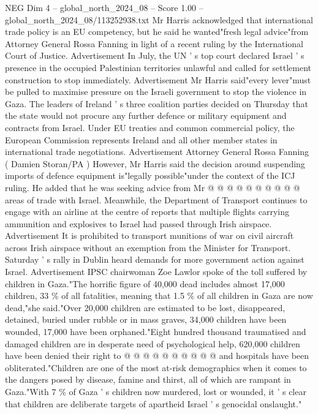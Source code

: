 \begin{textsample}{NEG Dim 4 – global\_north\_2024\_08 – Score 1.00 – global\_north\_2024\_08/113252938.txt}  \label{ex:f4_neg_296}
Mr Harris acknowledged that international trade policy is an EU competency, but he said he wanted"fresh legal advice"from Attorney General Rossa Fanning in light of a recent ruling by the International Court of Justice.
Advertisement In July, the UN ' s top court declared Israel ' s presence in the occupied Palestinian territories unlawful and called for settlement construction to stop immediately.
Advertisement Mr Harris said"every lever"must be pulled to maximise pressure on the Israeli government to stop the violence in Gaza.
The leaders of Ireland ' s three coalition parties decided on Thursday that the state would not procure any further defence or military equipment and contracts from Israel.
Under EU treaties and common commercial policy, the European Commission represents Ireland and all other member states in international trade negotiations.
Advertisement Attorney General Rossa Fanning ( Damien Storan/PA ) However, Mr Harris said the decision around suspending imports of defence equipment is"legally possible"under the context of the ICJ ruling.
He added that he was seeking advice from Mr @ @ @ @ @ @ @ @ @ @ areas of trade with Israel.
Meanwhile, the Department of Transport continues to engage with an airline at the centre of reports that multiple flights carrying ammunition and explosives to Israel had passed through Irish airspace.
Advertisement It is prohibited to transport munitions of war on civil aircraft across Irish airspace without an exemption from the Minister for Transport.
Saturday ' s rally in Dublin heard demands for more government action against Israel.
Advertisement IPSC chairwoman Zoe Lawlor spoke of the toll suffered by children in Gaza."The horrific figure of 40,000 dead includes almost 17,000 children, 33 \% of all fatalities, meaning that 1.5 \% of all children in Gaza are now dead,"she said."Over 20,000 children are estimated to be lost, disappeared, detained, buried under rubble or in mass graves, 34,000 children have been wounded, 17,000 have been orphaned."Eight hundred thousand traumatised and damaged children are in desperate need of psychological help, 620,000 children have been denied their right to @ @ @ @ @ @ @ @ @ @ and hospitals have been obliterated."Children are one of the most at-risk demographics when it comes to the dangers posed by disease, famine and thirst, all of which are rampant in Gaza."With 7 \% of Gaza ' s children now murdered, lost or wounded, it ' s clear that children are deliberate targets of apartheid Israel ' s genocidal onslaught."

\end{textsample}
